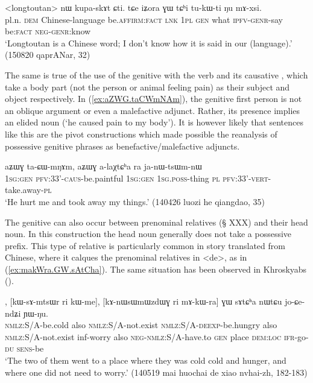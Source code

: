 \begin{exe}
\ex \label{ex:iZora.GW}
\gll  <longtoutan> nɯ kupa-skɤt ɕti. tɕe iʑora ɣɯ tɕʰi tu-kɯ-ti ŋu mɤ-xsi. \\
pl.n. \textsc{dem} Chinese-language be.\textsc{affirm}:\textsc{fact} \textsc{lnk} \textsc{1pl} \textsc{gen} what \textsc{ipfv}-\textsc{genr}-say be:\textsc{fact} \textsc{neg}-\textsc{genr}:know \\
\glt `Longtoutan is a Chinese word; I don't know how it is said in our (language).'  (150820 qaprANar, 32)
\end{exe}

The same is true of the use of the genitive with the verb  and its causative , which take a body part (not the person or animal feeling pain) as their subject and object respectively. In (\ref{ex:aZWG.taCWmNAm}), the genitive first person  is not an oblique argument or even a malefactive adjunct. Rather, its presence implies an elided noun  (`he caused pain to my body'). It is however likely that sentences like this are the pivot constructions which made possible the reanalysis of possessive genitive phrases as benefactive/malefactive adjuncts.

\begin{exe}
\ex \label{ex:aZWG.taCWmNAm}
\gll aʑɯɣ ta-ɕɯ-mŋɤm, aʑɯɣ a-laχtɕʰa ra ja-nɯ-tsɯm-nɯ \\
\textsc{1sg}:\textsc{gen} \textsc{pfv}:3\fl{}3'-\textsc{caus}-be.paintful \textsc{1sg}:\textsc{gen} \textsc{1sg}.\textsc{poss}-thing \textsc{pl} \textsc{pfv}:3\fl{}3'-\textsc{vert}-take.away-\textsc{pl} \\
\glt `He hurt me and took away my things.' (140426 luozi he qiangdao, 35)
\end{exe}

The genitive can also occur between prenominal relatives (§ XXX) and their head noun. In this construction the head noun generally does not take a possessive prefix. This type of relative is particularly common in story translated from Chinese, where it calques the prenominal relatives in  <de>, as in (\ref{ex:makWra.GW.sAtCha}). The same situation has been observed in Khroskyabs (\citealt[640-643]{lai17khroskyabs}).

\begin{exe}
\ex \label{ex:makWra.GW.sAtCha}
\gll [kɯ-ɣɤndʐo ri kɯ-me], [kɯ-sɤ-mtsɯr ri kɯ-me], [kɤ-nɯsɯmɯzdɯɣ ri mɤ-kɯ-ra] ɣɯ sɤtɕʰa nɯtɕu jo-ɕe-ndʑi ɲɯ-ŋu. \\
\textsc{nmlz}:S/A-be.cold also \textsc{nmlz}:S/A-not.exist \textsc{nmlz}:S/A-\textsc{deexp}-be.hungry also \textsc{nmlz}:S/A-not.exist inf-worry also \textsc{neg}-\textsc{nmlz}:S/A-have.to \textsc{gen} place \textsc{dem}:\textsc{loc} \textsc{ifr}-go-\textsc{du} \textsc{sens}-be \\
\glt  `The two of them went to a place where they was cold cold and hunger, and where one did not need to worry.' (140519 mai huochai de xiao nvhai-zh, 182-183)
\end{exe}

